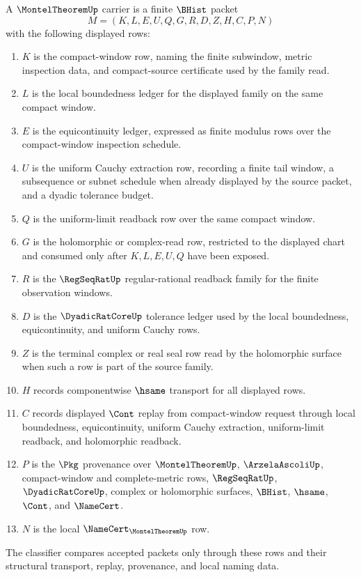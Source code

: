 \begin{definition}
\label{def:montel-theorem-carrier}
A $\MontelTheoremUp$ carrier is a finite $\BHist$ packet
$$
M=(K,L,E,U,Q,G,R,D,Z,H,C,P,N)
$$
with the following displayed rows:
\begin{enumerate}
\item $K$ is the compact-window row, naming the finite subwindow, metric inspection data, and compact-source certificate used by the family read.
\item $L$ is the local boundedness ledger for the displayed family on the same compact window.
\item $E$ is the equicontinuity ledger, expressed as finite modulus rows over the compact-window inspection schedule.
\item $U$ is the uniform Cauchy extraction row, recording a finite tail window, a subsequence or subnet schedule when already displayed by the source packet, and a dyadic tolerance budget.
\item $Q$ is the uniform-limit readback row over the same compact window.
\item $G$ is the holomorphic or complex-read row, restricted to the displayed chart and consumed only after $K,L,E,U,Q$ have been exposed.
\item $R$ is the $\RegSeqRatUp$ regular-rational readback family for the finite observation windows.
\item $D$ is the $\DyadicRatCoreUp$ tolerance ledger used by the local boundedness, equicontinuity, and uniform Cauchy rows.
\item $Z$ is the terminal complex or real seal row read by the holomorphic surface when such a row is part of the source family.
\item $H$ records componentwise $\hsame$ transport for all displayed rows.
\item $C$ records displayed $\Cont$ replay from compact-window request through local boundedness, equicontinuity, uniform Cauchy extraction, uniform-limit readback, and holomorphic readback.
\item $P$ is the $\Pkg$ provenance over $\MontelTheoremUp$, $\ArzelaAscoliUp$, compact-window and complete-metric rows, $\RegSeqRatUp$, $\DyadicRatCoreUp$, complex or holomorphic surfaces, $\BHist$, $\hsame$, $\Cont$, and $\NameCert$.
\item $N$ is the local $\NameCert_{\MontelTheoremUp}$ row.
\end{enumerate}
The classifier compares accepted packets only through these rows and their structural transport, replay, provenance, and local naming data.
\end{definition}

